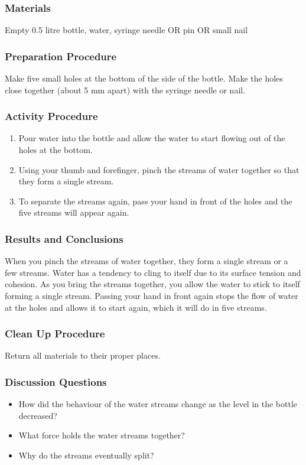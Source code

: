 \subsubsection*{Materials}
Empty 0.5 litre bottle, water, syringe needle OR pin OR small nail

\subsubsection*{Preparation Procedure}
Make five small holes at the bottom of the side of the bottle. Make the holes close together (about 5 mm apart) with the syringe needle or nail.

\subsubsection*{Activity Procedure}
\begin{enumerate}
\item{Pour water into the bottle and allow the water to start flowing out of the holes at the bottom.}
\item{Using your thumb and forefinger, pinch the streams of water together so that they form a single stream.}
\item{To separate the streams again, pass your hand in front of the holes and the five streams will appear again.}
\end{enumerate}

\subsubsection*{Results and Conclusions}
When you pinch the streams of water together, they form a single stream or a few streams. Water has a tendency to cling to itself due to its surface tension and cohesion. As you bring the streams together, you allow the water to stick to itself forming a single stream. Passing your hand in front again stops the flow of water at the holes and allows it to start again, which it will do in five streams.

\subsubsection*{Clean Up Procedure}
Return all materials to their proper places.

\subsubsection*{Discussion Questions}
\begin{itemize}
\item{How did the behaviour of the water streams change as the level in the bottle decreased?}
\item{What force holds the water streams together?}
\item{Why do the streams eventually split?}
\end{itemize}

